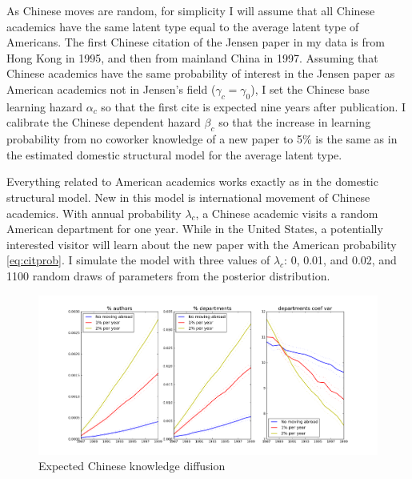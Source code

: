 As Chinese moves are random, for simplicity I will assume that all Chinese academics
have the same latent type equal to the average latent type
of Americans.  The first Chinese citation of the Jensen paper in my data is
from Hong Kong in 1995, and then from mainland China in 1997.  Assuming that 
Chinese academics have the same probability of interest in the Jensen paper
as American academics not in Jensen's field ($\gamma_c = \gamma_0$), I set the Chinese base learning 
hazard $\alpha_c$ so that the first cite is expected nine years after publication.
I calibrate the Chinese dependent hazard $\beta_c$ so that the increase in
learning probability from no coworker knowledge of a new paper to 5\% is the same
as in the estimated domestic structural model for the average latent type.\footnotemark{}

Everything related to American academics works exactly as in the domestic structural
model.  New in this model is international movement of
Chinese academics.  With annual probability $\lambda_c$, a Chinese academic visits a random
American department for one year.  While in the United States, a potentially interested
visitor will learn about the new paper with the American probability \eqref{eq:citprob}.  I
simulate the model with three values of $\lambda_c$: 0, 0.01, and 0.02, and
1100 random draws of parameters from the posterior distribution.

\begin{figure}[!ht]
    \centering
    \includegraphics[scale=0.35]{pics/sim_plots_cs.png}
    \caption{Expected Chinese knowledge diffusion}
    \label{fig:chinsim}
\end{figure}

